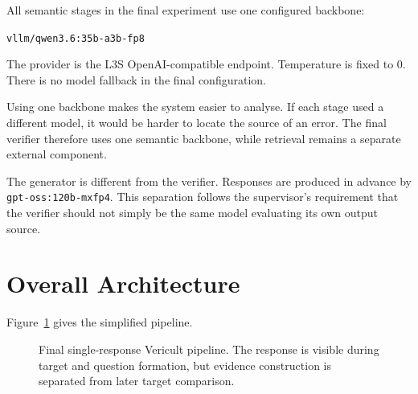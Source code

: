 All semantic stages in the final experiment use one configured backbone:

\begin{center}
\texttt{vllm/qwen3.6:35b-a3b-fp8}
\end{center}

The provider is the L3S OpenAI-compatible endpoint. Temperature is fixed to 0. There is no model fallback in the final configuration.

Using one backbone makes the system easier to analyse. If each stage used a different model, it would be harder to locate the source of an error. The final verifier therefore uses one semantic backbone, while retrieval remains a separate external component.

The generator is different from the verifier. Responses are produced in advance by \texttt{gpt-oss:120b-mxfp4}. This separation follows the supervisor's requirement that the verifier should not simply be the same model evaluating its own output source.

\section{Overall Architecture}

Figure~\ref{fig:pipeline} gives the simplified pipeline.

\begin{figure}[ht]
\centering
{}
\caption{Final single-response Vericult pipeline. The response is visible during target and question formation, but evidence construction is separated from later target comparison.}
\label{fig:pipeline}
\end{figure}

